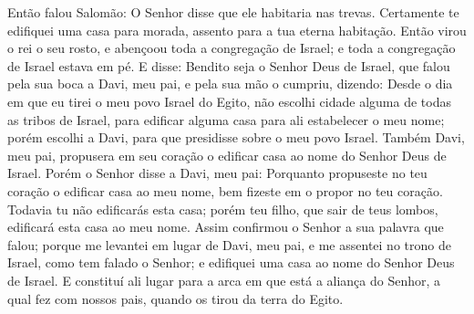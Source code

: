 Então falou Salomão: O Senhor disse que ele habitaria nas trevas.
Certamente te edifiquei uma casa para morada, assento para a
tua eterna habitação. Então virou o rei o seu rosto, e
abençoou toda a congregação de Israel; e toda a congregação de
Israel estava em pé. E disse: Bendito seja o Senhor Deus de
Israel, que falou pela sua boca a Davi, meu pai, e pela sua mão o
cumpriu, dizendo: Desde o dia em que eu tirei o meu povo
Israel do Egito, não escolhi cidade alguma de todas as tribos de
Israel, para edificar alguma casa para ali estabelecer o meu nome;
porém escolhi a Davi, para que presidisse sobre o meu povo Israel.
Também Davi, meu pai, propusera em seu coração o edificar
casa ao nome do Senhor Deus de Israel. Porém o Senhor disse a
Davi, meu pai: Porquanto propuseste no teu coração o edificar casa
ao meu nome, bem fizeste em o propor no teu coração. Todavia
tu não edificarás esta casa; porém teu filho, que sair de teus
lombos, edificará esta casa ao meu nome. Assim confirmou o
Senhor a sua palavra que falou; porque me levantei em lugar de Davi,
meu pai, e me assentei no trono de Israel, como tem falado o Senhor;
e edifiquei uma casa ao nome do Senhor Deus de Israel. E
constituí ali lugar para a arca em que está a aliança do Senhor, a
qual fez com nossos pais, quando os tirou da terra do Egito.

